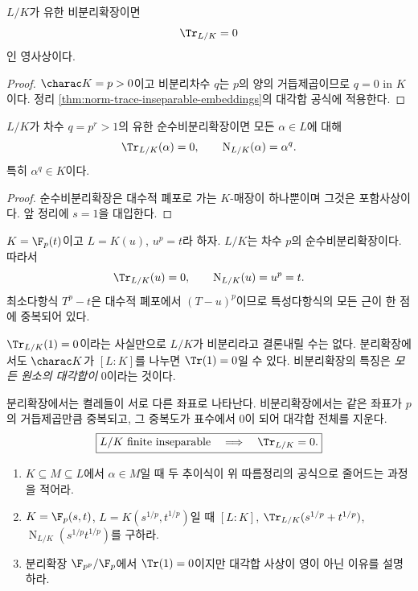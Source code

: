 \begin{corollary}
\label{cor:inseparable-trace-zero}
$L/K$가 유한 비분리확장이면
\[
  \Tr_{L/K}=0
\]
인 영사상이다.
\end{corollary}

\begin{proof}
$\charac K=p>0$이고 비분리차수 $q$는 $p$의 양의 거듭제곱이므로 $q=0$ in $K$이다. 정리 \ref{thm:norm-trace-inseparable-embeddings}의 대각합 공식에 적용한다.
\end{proof}

\begin{corollary}[순수비분리확장]
\label{cor:purely-inseparable-norm-trace}
$L/K$가 차수 $q=p^r>1$의 유한 순수비분리확장이면 모든 $\alpha\in L$에 대해
\[
  \Tr_{L/K}(\alpha)=0,
  \qquad
  \operatorname N_{L/K}(\alpha)=\alpha^q.
\]
특히 $\alpha^q\in K$이다.
\end{corollary}

\begin{proof}
순수비분리확장은 대수적 폐포로 가는 $K$-매장이 하나뿐이며 그것은 포함사상이다. 앞 정리에 $s=1$을 대입한다.
\end{proof}

\begin{example}
$K=\F_p(t)$이고 $L=K(u)$, $u^p=t$라 하자. $L/K$는 차수 $p$의 순수비분리확장이다. 따라서
\[
  \Tr_{L/K}(u)=0,
  \qquad
  \operatorname N_{L/K}(u)=u^p=t.
\]
최소다항식 $T^p-t$은 대수적 폐포에서 $(T-u)^p$이므로 특성다항식의 모든 근이 한 점에 중복되어 있다.
\end{example}

\begin{pitfall}
$\Tr_{L/K}(1)=0$이라는 사실만으로 $L/K$가 비분리라고 결론내릴 수는 없다. 분리확장에서도 $\charac K$가 $[L:K]$를 나누면 $\Tr(1)=0$일 수 있다. 비분리확장의 특징은 \emph{모든 원소의 대각합이} $0$이라는 것이다.
\end{pitfall}

\begin{keyidea}
분리확장에서는 켤레들이 서로 다른 좌표로 나타난다. 비분리확장에서는 같은 좌표가 $p$의 거듭제곱만큼 중복되고, 그 중복도가 표수에서 $0$이 되어 대각합 전체를 지운다.
\[
  \boxed{
  L/K\text{ finite inseparable}
  \quad\Longrightarrow\quad
  \Tr_{L/K}=0.}
\]
\end{keyidea}

\begin{checkpoint}
\begin{enumerate}[label=(\alph*)]
  \item $K\subseteq M\subseteq L$에서 $\alpha\in M$일 때 두 추이식이 위 따름정리의 공식으로 줄어드는 과정을 적어라.
  \item $K=\F_p(s,t)$, $L=K(s^{1/p},t^{1/p})$일 때 $[L:K]$, $\Tr_{L/K}(s^{1/p}+t^{1/p})$, $\operatorname N_{L/K}(s^{1/p}t^{1/p})$를 구하라.
  \item 분리확장 $\F_{p^p}/\F_p$에서 $\Tr(1)=0$이지만 대각합 사상이 영이 아닌 이유를 설명하라.
\end{enumerate}
\end{checkpoint}
